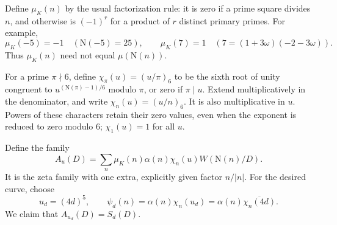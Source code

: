 \documentclass[11pt]{article}
\numberwithin{equation}{section}
\newcommand{\N}{\mathrm N}
\newcommand{\muk}{\mu_K}
\begin{document}
Define $\muk(n)$ by the usual factorization rule: it is zero if a prime
square divides $n$, and otherwise is $(-1)^r$ for a product of $r$ distinct
primary primes. For example,
\begin{equation}\label{eq:d009}
 \muk(-5)=-1\quad(\N(-5)=25),\qquad
 \muk(7)=1\quad(7=(1+3\omega)(-2-3\omega)).
\end{equation}
Thus $\muk(n)$ need not equal $\mu(\N(n))$.

For a prime $\pi\nmid6$, define $\chi_\pi(u)=(u/\pi)_6$ to be the sixth
root of unity congruent to $u^{(\N(\pi)-1)/6}$ modulo $\pi$, or zero if
$\pi\mid u$. Extend multiplicatively in the denominator, and write
$\chi_n(u)=(u/n)_6$. It is also multiplicative in $u$.
Powers of these characters retain their zero values, even when the
exponent is reduced to zero modulo $6$; $\chi_1(u)=1$ for all $u$.

Define the family
\begin{equation}\label{eq:Au}
 A_u(D)=\sum_n\muk(n)\alpha(n)\chi_n(u)W(\N(n)/D).
\end{equation}
It is the zeta family with one extra, explicitly given factor $n/|n|$.
For the desired curve, choose
\begin{equation}\label{eq:ud}
 u_d=(4d)^5,\qquad
 \psi_d(n)=\alpha(n)\chi_n(u_d)
          =\alpha(n)\overline{\chi_n(4d)}.
\end{equation}
We claim that $A_{u_d}(D)=S_d(D)$.
\end{document}
